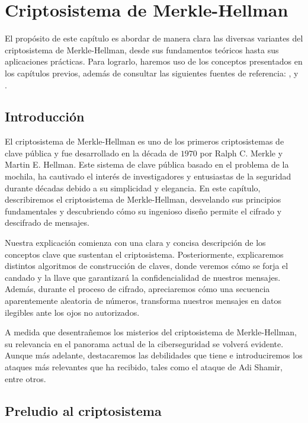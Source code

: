 \chapter{Criptosistema de Merkle-Hellman} \label{ch:tercer-capitulo}

    El propósito de este capítulo es abordar de manera clara las diversas variantes del criptosistema de Merkle-Hellman, desde sus fundamentos teóricos hasta sus aplicaciones prácticas. Para lograrlo, haremos uso de los conceptos presentados en los capítulos previos, además de consultar las siguientes fuentes de referencia: \cite{artMH}, \cite{artOd} y \cite{artTiwari}.
    
    \section{Introducción}
    
    El criptosistema de Merkle-Hellman es uno de los primeros criptosistemas de clave pública y fue desarrollado en la década de $1970$ por Ralph C. Merkle y Martin E. Hellman. Este sistema de clave pública basado en el problema de la mochila, ha cautivado el interés de investigadores y entusiastas de la seguridad durante décadas debido a su simplicidad y elegancia. En este capítulo, describiremos el criptosistema de Merkle-Hellman, desvelando sus principios fundamentales y descubriendo cómo su ingenioso diseño permite el cifrado y descifrado de mensajes.
    
    Nuestra explicación comienza con una clara y concisa descripción de los conceptos clave que sustentan el criptosistema. Posteriormente, explicaremos distintos algoritmos de construcción de claves, donde veremos cómo se forja el candado y la llave que garantizará la confidencialidad de nuestros mensajes. Además, durante el proceso de cifrado, apreciaremos cómo una secuencia aparentemente aleatoria de números, transforma nuestros mensajes en datos ilegibles ante los ojos no autorizados.

    A medida que desentrañemos los misterios del criptosistema de Merkle-Hellman, su relevancia en el panorama actual de la ciberseguridad se volverá evidente. Aunque más adelante, destacaremos las debilidades que tiene e introduciremos los ataques más relevantes que ha recibido, tales como el ataque de Adi Shamir, entre otros.

    \section{Preludio al criptosistema} \label{sec:3.2}

